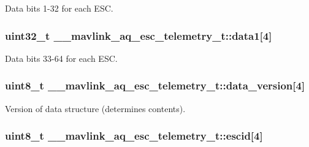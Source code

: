 Data bits 1-\/32 for each E\+S\+C. 

\hypertarget{struct____mavlink__aq__esc__telemetry__t_af3fc0abe528e3ed92bb40eedf39466ac}{
\subsubsection[{data1}]{\setlength{\rightskip}{0pt plus 5cm}uint32\+\_\+t \+\_\+\+\_\+mavlink\+\_\+aq\+\_\+esc\+\_\+telemetry\+\_\+t\+::data1\mbox{[}4\mbox{]}}}\label{struct____mavlink__aq__esc__telemetry__t_af3fc0abe528e3ed92bb40eedf39466ac}


Data bits 33-\/64 for each E\+S\+C. 

\hypertarget{struct____mavlink__aq__esc__telemetry__t_a52e85169894e5ebdb2389dab80d3cff9}{
\subsubsection[{data\+\_\+version}]{\setlength{\rightskip}{0pt plus 5cm}uint8\+\_\+t \+\_\+\+\_\+mavlink\+\_\+aq\+\_\+esc\+\_\+telemetry\+\_\+t\+::data\+\_\+version\mbox{[}4\mbox{]}}}\label{struct____mavlink__aq__esc__telemetry__t_a52e85169894e5ebdb2389dab80d3cff9}


Version of data structure (determines contents). 

\hypertarget{struct____mavlink__aq__esc__telemetry__t_adfcfbcce4213bf8e41d71c4b1ec21284}{
\subsubsection[{escid}]{\setlength{\rightskip}{0pt plus 5cm}uint8\+\_\+t \+\_\+\+\_\+mavlink\+\_\+aq\+\_\+esc\+\_\+telemetry\+\_\+t\+::escid\mbox{[}4\mbox{]}}}\label{struct____mavlink__aq__esc__telemetry__t_adfcfbcce4213bf8e41d71c4b1ec21284}


